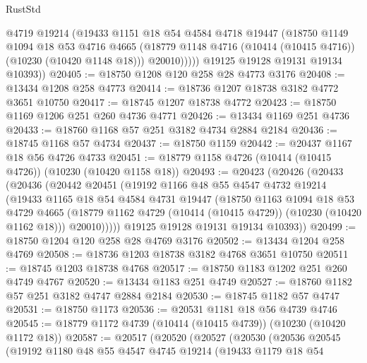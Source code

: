 \begin{lexlean}{RustStd}
\begin{coremodule}
              @4719
              @19214
              (@19433
                @1151
                @18
                @54
                @4584
                @4718
                @19447
                (@18750
                  @1149
                  @1094
                  @18
                  @53
                  @4716
                  @4665
                  (@18779 @1148 @4716 (@10414 (@10415 @4716)) (@10230 (@10420 @1148 @18)))
                  @20010)))))
        @19125
        @19128
        @19131
        @19134
        @10393))
@20405 := @18750 @1208 @120 @258 @28 @4773 @3176
@20408 := @13434 @1208 @258 @4773
@20414 := @18736 @1207 @18738 @3182 @4772 @3651 @10750
@20417 := @18745 @1207 @18738 @4772
@20423 := @18750 @1169 @1206 @251 @260 @4736 @4771
@20426 := @13434 @1169 @251 @4736
@20433 := @18760 @1168 @57 @251 @3182 @4734 @2884 @2184
@20436 := @18745 @1168 @57 @4734
@20437 := @18750 @1159
@20442 := @20437 @1167 @18 @56 @4726 @4733
@20451 := @18779 @1158 @4726 (@10414 (@10415 @4726)) (@10230 (@10420 @1158 @18))
@20493 := @20423
    (@20426
      (@20433
        (@20436
          (@20442
            @20451
            (@19192
              @1166
              @48
              @55
              @4547
              @4732
              @19214
              (@19433
                @1165
                @18
                @54
                @4584
                @4731
                @19447
                (@18750
                  @1163
                  @1094
                  @18
                  @53
                  @4729
                  @4665
                  (@18779 @1162 @4729 (@10414 (@10415 @4729)) (@10230 (@10420 @1162 @18)))
                  @20010)))))
        @19125
        @19128
        @19131
        @19134
        @10393))
@20499 := @18750 @1204 @120 @258 @28 @4769 @3176
@20502 := @13434 @1204 @258 @4769
@20508 := @18736 @1203 @18738 @3182 @4768 @3651 @10750
@20511 := @18745 @1203 @18738 @4768
@20517 := @18750 @1183 @1202 @251 @260 @4749 @4767
@20520 := @13434 @1183 @251 @4749
@20527 := @18760 @1182 @57 @251 @3182 @4747 @2884 @2184
@20530 := @18745 @1182 @57 @4747
@20531 := @18750 @1173
@20536 := @20531 @1181 @18 @56 @4739 @4746
@20545 := @18779 @1172 @4739 (@10414 (@10415 @4739)) (@10230 (@10420 @1172 @18))
@20587 := @20517
    (@20520
      (@20527
        (@20530
          (@20536
            @20545
            (@19192
              @1180
              @48
              @55
              @4547
              @4745
              @19214
              (@19433
                @1179
                @18
                @54

\end{coremodule}
\end{lexlean}
